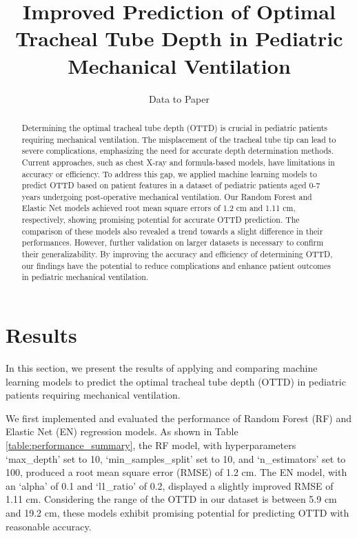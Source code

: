 \documentclass[11pt]{article}
\title{Improved Prediction of Optimal Tracheal Tube Depth in Pediatric Mechanical Ventilation}
\author{Data to Paper}
\begin{document}
\maketitle
\begin{abstract}
Determining the optimal tracheal tube depth (OTTD) is crucial in pediatric patients requiring mechanical ventilation. The misplacement of the tracheal tube tip can lead to severe complications, emphasizing the need for accurate depth determination methods. Current approaches, such as chest X-ray and formula-based models, have limitations in accuracy or efficiency. To address this gap, we applied machine learning models to predict OTTD based on patient features in a dataset of pediatric patients aged 0-7 years undergoing post-operative mechanical ventilation. Our Random Forest and Elastic Net models achieved root mean square errors of 1.2 cm and 1.11 cm, respectively, showing promising potential for accurate OTTD prediction. The comparison of these models also revealed a trend towards a slight difference in their performances. However, further validation on larger datasets is necessary to confirm their generalizability. By improving the accuracy and efficiency of determining OTTD, our findings have the potential to reduce complications and enhance patient outcomes in pediatric mechanical ventilation.
\end{abstract}
\section*{Results}

In this section, we present the results of applying and comparing machine learning models to predict the optimal tracheal tube depth (OTTD) in pediatric patients requiring mechanical ventilation.

We first implemented and evaluated the performance of Random Forest (RF) and Elastic Net (EN) regression models. As shown in Table \ref{table:performance_summary}, the RF model, with hyperparameters ‘max\_depth’ set to 10, ‘min\_samples\_split’ set to 10, and ‘n\_estimators’ set to 100, produced a root mean square error (RMSE) of 1.2 cm. The EN model, with an ‘alpha’ of 0.1 and ‘l1\_ratio’ of 0.2, displayed a slightly improved RMSE of 1.11 cm. Considering the range of the OTTD in our dataset is between 5.9 cm and 19.2 cm, these models exhibit promising potential for predicting OTTD with reasonable accuracy.
\end{document}
